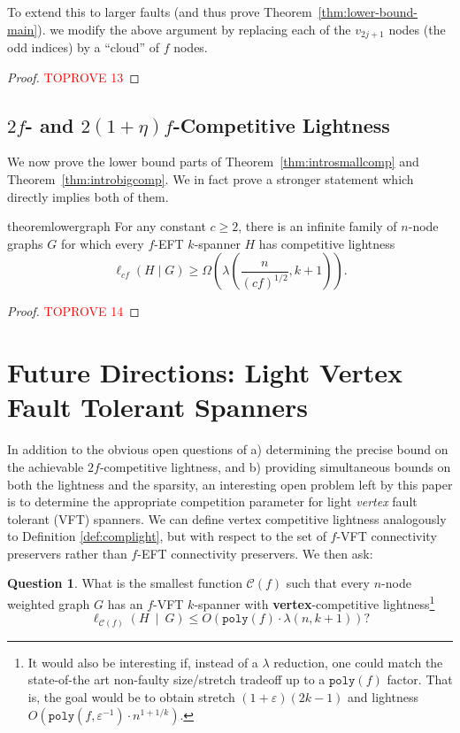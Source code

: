 \documentclass{article}
\theoremstyle{plain}
\theoremstyle{definition}
\newtheorem{question}[theorem]{Question}
\newcommand{\eps}{\varepsilon}
\begin{document}
To extend this to larger faults (and thus prove Theorem~\ref{thm:lower-bound-main}). we modify the above argument by replacing each of the $v_{2j+1}$ nodes (the odd indices) by a ``cloud'' of $f$ nodes.

\begin{proof}\textcolor{red}{TOPROVE 13}\end{proof}

\subsection{$2f$- and $2(1+\eta)f$-Competitive Lightness} \label{sec:lowerbigcompetitive}
We now prove the lower bound parts of Theorem~\ref{thm:introsmallcomp} and Theorem~\ref{thm:introbigcomp}.  We in fact prove a stronger statement which directly implies both of them.



\begin{restatable}{theorem}{lowergraph} \label{thm:lower-bound-lambda-graph}
     For any constant $c \geq 2$, there is an infinite family of $n$-node graphs $G$ for which every $f$-EFT $k$-spanner $H$ has competitive lightness
     $$\ell_{cf}(H \mid G) \geq \Omega\left(\lambda\left(\frac{n}{(cf)^{1/2}}, k+1\right)\right).$$
\end{restatable}
\begin{proof}\textcolor{red}{TOPROVE 14}\end{proof}

\fi

\section{Future Directions: Light Vertex Fault Tolerant Spanners \label{sec:vft}}
In addition to the obvious open questions of a) determining the precise bound on the achievable $2f$-competitive lightness, and b) providing simultaneous bounds on both the lightness and the sparsity, an interesting open problem left by this paper is to determine the appropriate competition parameter for light \emph{vertex} fault tolerant (VFT) spanners. 
We can define vertex competitive lightness analogously to Definition \ref{def:complight}, but with respect to the set of $f$-VFT connectivity preservers rather than $f$-EFT connectivity preservers.
We then ask:

\begin{question}
What is the smallest function $\mathcal{C}(f)$ such that every $n$-node weighted graph $G$ has an $f$-VFT $k$-spanner with \textbf{vertex}-competitive lightness\footnote{It would also be interesting if, instead of a $\lambda$ reduction, one could match the state-of-the art non-faulty size/stretch tradeoff up to a $\texttt{poly}(f)$ factor.  That is, the goal would be to obtain stretch $(1+\eps)(2k-1)$ and lightness $O\left(\texttt{poly}(f, \eps^{-1}) \cdot n^{1+1/k}\right).$}
$$\ell_{\mathcal{C}(f)}(H \ \mid \ G) \le O\left( \texttt{poly}(f) \cdot \lambda(n, k+1) \right)?$$
\end{question}
\end{document}
